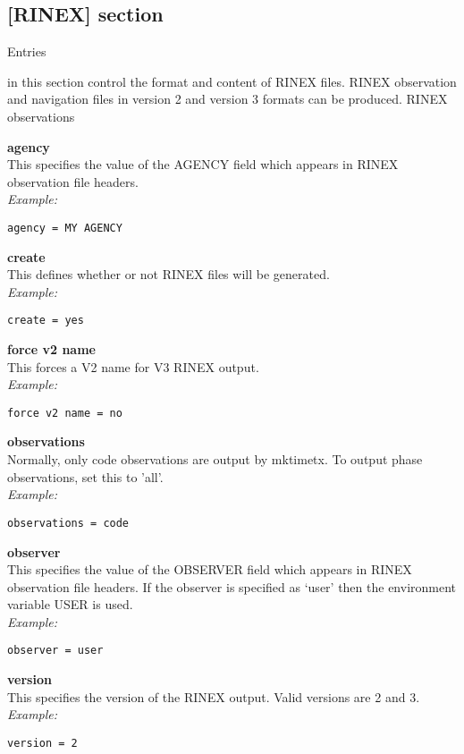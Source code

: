 \subsection{[RINEX] section}

\hypertarget{h:rinex}{Entries} in this section control the format and content of RINEX files.
RINEX observation and navigation files in version 2 and version 3 formats can be produced.
RINEX observations 

{\bfseries agency}\\ \hypertarget{h:rinex_agency}{}
This specifies the value of the AGENCY field which appears in RINEX observation file headers.\\
\textit{Example:}
\begin{lstlisting}
agency = MY AGENCY
\end{lstlisting}

{\bfseries create}\\
This defines whether or not RINEX files will be generated.\\
\textit{Example:}
\begin{lstlisting}
create = yes
\end{lstlisting}

{\bfseries force v2 name}\\
This forces a V2 name for V3 RINEX output.\\
\textit{Example:}
\begin{lstlisting}
force v2 name = no
\end{lstlisting}

{\bfseries observations}\\ \hypertarget{h:rinex_observation}{}
Normally, only code observations are output by mktimetx. 
To output phase observations, set this to 'all'.\\
\textit{Example:}
\begin{lstlisting}
observations = code
\end{lstlisting}

{\bfseries observer}\\ \hypertarget{h:rinex_observer}{}
This specifies the value of the OBSERVER field which appears in RINEX observation file headers.
If the observer is specified as `user' then the environment variable USER is used.\\
\textit{Example:}
\begin{lstlisting}
observer = user
\end{lstlisting}

{\bfseries version}\\ \hypertarget{h:rinex_version}{}
This  specifies the version of the RINEX output. Valid versions are 2 and 3.\\
\textit{Example:}
\begin{lstlisting}
version = 2
\end{lstlisting}


